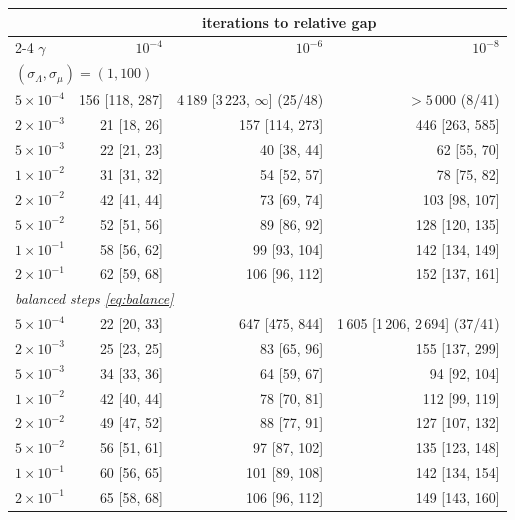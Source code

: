 \begin{tabular}{l rrr}
\toprule
 & \multicolumn{3}{c}{iterations to relative gap} \\
\cmidrule(lr){2-4}
$\gamma$ & $10^{-4}$ & $10^{-6}$ & $10^{-8}$ \\
\midrule
\multicolumn{4}{l}{\emph{$(\sigma_\Lambda,\sigma_\mu)=(1,100)$}} \\
$5\times10^{-4}$ & 156 [118, 287] & 4\,189 [3\,223, $\infty$] (25/48) & $>5\,000$ (8/41) \\
$2\times10^{-3}$ & 21 [18, 26] & 157 [114, 273] & 446 [263, 585] \\
$5\times10^{-3}$ & 22 [21, 23] & 40 [38, 44] & 62 [55, 70] \\
$1\times10^{-2}$ & 31 [31, 32] & 54 [52, 57] & 78 [75, 82] \\
$2\times10^{-2}$ & 42 [41, 44] & 73 [69, 74] & 103 [98, 107] \\
$5\times10^{-2}$ & 52 [51, 56] & 89 [86, 92] & 128 [120, 135] \\
$1\times10^{-1}$ & 58 [56, 62] & 99 [93, 104] & 142 [134, 149] \\
$2\times10^{-1}$ & 62 [59, 68] & 106 [96, 112] & 152 [137, 161] \\
\midrule
\multicolumn{4}{l}{\emph{balanced steps \eqref{eq:balance}}} \\
$5\times10^{-4}$ & 22 [20, 33] & 647 [475, 844] & 1\,605 [1\,206, 2\,694] (37/41) \\
$2\times10^{-3}$ & 25 [23, 25] & 83 [65, 96] & 155 [137, 299] \\
$5\times10^{-3}$ & 34 [33, 36] & 64 [59, 67] & 94 [92, 104] \\
$1\times10^{-2}$ & 42 [40, 44] & 78 [70, 81] & 112 [99, 119] \\
$2\times10^{-2}$ & 49 [47, 52] & 88 [77, 91] & 127 [107, 132] \\
$5\times10^{-2}$ & 56 [51, 61] & 97 [87, 102] & 135 [123, 148] \\
$1\times10^{-1}$ & 60 [56, 65] & 101 [89, 108] & 142 [134, 154] \\
$2\times10^{-1}$ & 65 [58, 68] & 106 [96, 112] & 149 [143, 160] \\
\bottomrule
\end{tabular}
